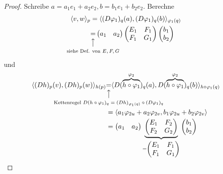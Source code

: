 \documentclass[../main.tex]{subfiles}
\begin{document}
\begin{proof}
    Schreibe $a=a_1e_1 +a_2e_2, b=b_1e_1+b_2e_2$. Berechne
    \begin{align*}
        \langle v,w \rangle _p &=\langle (D\varphi_1)_q(a), (D\varphi_1)_q(b)\rangle_{\varphi_1(q)} \\
        &\vertarrowbox[3ex]{=}{siehe Def. von $E,F,G$} \begin{pmatrix}
            a_1 & a_2
        \end{pmatrix}\begin{pmatrix}
            E_1 & F_1 \\ F_1 & G_1
        \end{pmatrix}\begin{pmatrix}
            b_1 \\ b_2
        \end{pmatrix}
    \end{align*} und 
    \begin{align*}
        \langle (Dh)_p(v), (Dh)_p(w) \rangle _{h(p)} &\vertarrowbox[3ex]{=}{Kettenregel $D(h\circ \varphi_1)_q=(Dh)_{\varphi_1(q)}\circ (D\varphi_1)_q$} \langle D(\overbrace{h \circ \varphi_1}^{\varphi_2})_q(a), D(\overbrace{h \circ \varphi_1}^{\varphi_2})_q(b)\rangle _{h\circ \varphi_1(q)}\\
        &= \langle a_1\varphi_{2u} + a_2\varphi_{2v}, b_1\varphi_{2u}+b_2\varphi_{2v}\rangle \\
        &= \begin{pmatrix}
            a_1 & a_2
        \end{pmatrix}\underbrace{\begin{pmatrix}
            E_1 & F_2 \\ F_2 & G_2
        \end{pmatrix}}_{=\begin{pmatrix}
            E_1 & F_1 \\ F_1 & G_1
        \end{pmatrix}}\begin{pmatrix}
            b_1 \\ b_2
        \end{pmatrix}
    \end{align*}
\end{proof}
\end{document}
